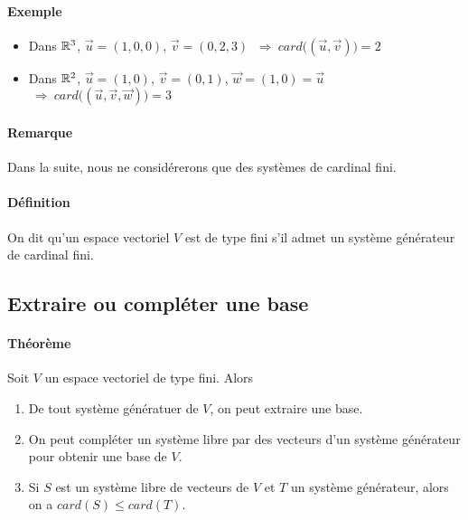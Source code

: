 \paragraph{Exemple} 
\begin{itemize}
  \item Dans $\mathbb{R}^3$, $\vec{u} = (1, 0, 0)$, $\vec{v} = (0, 2, 3)$ $ ~ \Rightarrow ~ card\big((\vec{u}, \vec{v})\big) = 2$
  \item Dans $\mathbb{R}^2$, $\vec{u} = (1, 0)$, $\vec{v} = (0, 1)$, $\vec{w} = (1, 0) = \vec{u}$ $ ~ \Rightarrow ~ card\big((\vec{u}, \vec{v}, \vec{w})\big) = 3$
\end{itemize}

\paragraph{Remarque} Dans la suite, nous ne considérerons que des systèmes de cardinal fini.

\paragraph{Définition} On dit qu'un espace vectoriel $V$ est de type fini s'il admet un système générateur de cardinal fini.

%
\subsection{Extraire ou compléter une base}
%
\paragraph{Théorème} Soit $V$ un espace vectoriel de type fini. Alors
\begin{enumerate} 
  \item De tout système génératuer de $V$, on peut extraire une base.
  \item On peut compléter un système libre par des vecteurs d'un système générateur pour obtenir une base de $V$.
  \item Si $S$ est un système libre de vecteurs de $V$ et $T$ un système générateur, alors on a $card(S) \leq card(T)$.
\end{enumerate}

